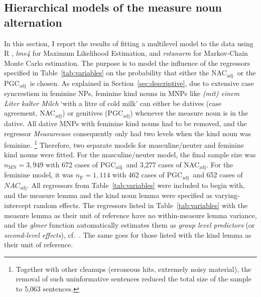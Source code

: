\documentclass[USenglish]{article}
\newcommand{\Sub}[1]{\ensuremath{\mathrm{_{#1}}}}
\newcommand{\NACa}{NAC\Sub{adj}}
\newcommand{\PGCa}{PGC\Sub{adj}}
\begin{document}
\subsection{Hierarchical models of the measure noun alternation}
\label{sec:corpushierarchicalmodel}

In this section, I report the results of fitting a multilevel model to the data using R \citep{R}, \textit{lme4} \citep{lme4} for Maximum Likelihood Estimation, and \textit{rstanarm} \citep{rstanarm} for Markov-Chain Monte Carlo estimation.
The purpose is to model the influence of the regressors specified in Table~\ref{tab:variables} on the probability that either the \NACa\ or the \PGCa\ is chosen.
As explained in Section~\ref{sec:descriptive}, due to extensive case syncrestism in feminine NPs, feminine kind nouns in MNPs like \textit{(mit) einem Liter kalter Milch} `with a litre of cold milk' can either be datives (case agreement, \NACa) or genitives (\PGCa) whenever the measure noun is in the dative.
All dative MNPs with feminine kind nouns had to be removed, and the regressor \textit{Measurecase} consequently only had two levels when the kind noun was feminine.%
\footnote{Together with other cleanups (erroneous hits, extremely noisy material), the removal of such uninformative sentences reduced the total size of the sample to 5,063 sentences.}
Therefore, two separate models for masculine\slash neuter and feminine kind nouns were fitted.
For the masculine\slash neuter model, the final sample size was $n_{\text{MN}}=3,949$ with 672 cases of \PGCa\ and 3,277 cases of \NACa.
For the feminine model, it was $n_{\text{F}}=1,114$ with 462 cases of \PGCa\ and 652 cases of $\NACa$.
All regressors from Table~\ref{tab:variables} were included to begin with, and the measure lemma and the kind noun lemma were specified as varying-intercept random effects.
The regressors listed in Table~\ref{tab:variables} with the measure lemma as their unit of reference have no within-measure lemma variance, and the \textit{glmer} function automatically estimates them as \textit{group level predictors} (or \textit{second-level effects}), cf.\ \cite[265--269,302--304]{GelmanHill2006}.
The same goes for those listed with the kind lemma as their unit of reference.


\end{document}
